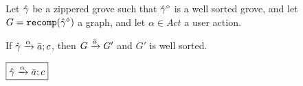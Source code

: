 Let $\Z{\Grove}$ be a zippered grove such that $\erase{\Z{\Grove}}$ is a well sorted grove,
and let $G = \recomp{\erase{\Z{\Grove}}}$ a graph,
and let $\alpha \in Act$ a user action.

\begin{theorem}[Sensibility]
  If $\applyAction{\Z{\Grove}}{\alpha}{\Q{a}}{c}$,
  then $G \action{\Q{a}} G'$ and $G'$ is well sorted.
\end{theorem}

\noindent $\boxed{\applyAction{ \Z{\Grove} }{ \alpha }{ \Q{a} }{ c }}$
%
\begin{mathpar}


\end{mathpar}

